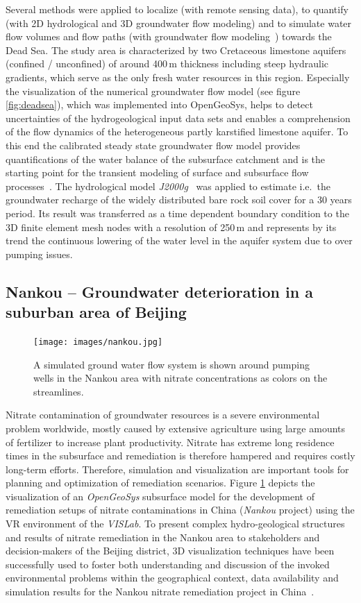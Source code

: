 \documentclass[twocolumn]{svjour3}          %
\begin{document}
Several methods were applied to localize (with remote sensing data), to quantify (with 2D hydrological and 3D groundwater flow modeling) and to simulate water flow volumes and flow paths (with groundwater flow modeling~\cite{graebe:modelcare}) towards the Dead Sea. The study area is characterized by two Cretaceous limestone aquifers (confined / unconfined) of around 400\,m thickness including steep hydraulic gradients, which serve as the only fresh water resources in this region. Especially the visualization of the numerical groundwater flow model (see figure \ref{fig:deadsea}), which was implemented into OpenGeoSys, helps to detect uncertainties of the hydrogeological input data sets and enables a comprehension of the flow dynamics of the heterogeneous partly karstified limestone aquifer. To this end the calibrated steady state groundwater flow model provides quantifications of the water balance of the subsurface catchment and is the starting point for the transient modeling of surface and subsurface flow processes~\cite{graebe:wessti}. The hydrological model \emph{J2000g}~\cite{KrauseKralisch:2005, Krause:2001} was applied to estimate i.e.~the groundwater recharge of the widely distributed bare rock soil cover for a 30 years period. Its result was transferred as a time dependent boundary condition to the 3D finite element mesh nodes with a resolution of 250\,m and represents by its trend the continuous lowering of the water level in the aquifer system due to over pumping issues.

\subsection{Nankou -- Groundwater deterioration in a suburban area of Beijing}
\label{nankou}

\begin{figure}[htb]
  \texttt{[image: images/nankou.jpg]}
\caption{A simulated ground water flow system is shown around pumping wells in the Nankou area with nitrate concentrations as colors on the streamlines.}
\label{fig:nankou}
\end{figure}

Nitrate contamination of groundwater resources is a severe environmental problem worldwide, mostly caused by extensive agriculture using large amounts of fertilizer to increase plant productivity. Nitrate has extreme long residence times in the subsurface and remediation is therefore hampered and requires costly long-term efforts. Therefore, simulation and visualization are important tools for planning and optimization of remediation scenarios. Figure \ref{fig:nankou} depicts the visualization of an \emph{OpenGeoSys} subsurface model for the development of remediation setups of nitrate contaminations in China (\emph{Nankou} project) using the VR environment of the \emph{VISLab}. To present complex hydro-geological structures and results of nitrate remediation in the Nankou area to stakeholders and decision-makers of the Beijing district, 3D visualization techniques have been successfully used to foster both understanding and discussion of the invoked environmental problems within the geographical context, data availability and simulation results for the Nankou nitrate remediation project in China~\cite{sun:ees}.
\end{document}
